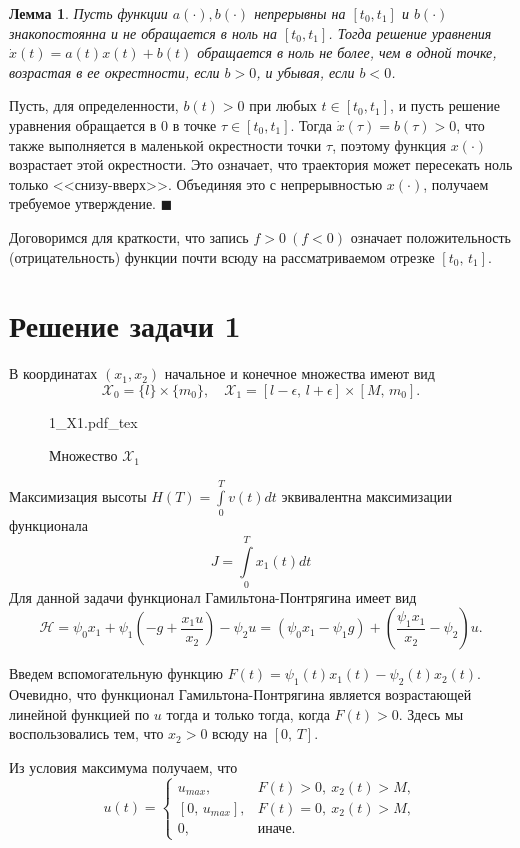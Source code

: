 \documentclass[16pt]{article}
\newcommand{\incfig}[2]{%
    \def\svgwidth{#2 mm}
    {#1.pdf_tex}
}
\newtheorem{Lem}{Лемма}
\newenvironment{Proof}{\par\noindent{\bf Доказательство.}}{\hfill$\scriptstyle\blacksquare$}
\newcommand\A{(\cdot)}
\newcommand\Int[2]{\int\limits_{#1}^{#2}}
\newcommand\X{\mathcal{X}}
\newcommand\Pict[3]{
\begin{figure}[h!]
    \centering
    \incfig{#1}{#3}
    \caption{#2}
    \label{fig:#1}
\end{figure}
}
\begin{document}
\begin{Lem}
Пусть функции $a\A, b\A$ непрерывны на $[t_0, t_1]$ и $b\A$ знакопостоянна и не обращается в ноль на $[t_0, t_1]$.
Тогда решение уравнения $\dot{x}(t) = a(t)x(t) + b(t)$ обращается в ноль не более, чем в одной точке, возрастая в ее  окрестности, если $b > 0$, и убывая, если $b < 0$.
\end{Lem}
\begin{Proof}
Пусть, для определенности, $b(t) > 0$ при любых $t \in [t_0, t_1]$, и пусть решение уравнения обращается в 0
в точке $\tau \in [t_0, t_1]$. Тогда $\dot{x}(\tau) = b(\tau) > 0$, что также выполняется в маленькой окрестности точки $\tau$, поэтому функция $x\A$ возрастает этой окрестности.
Это означает, что траектория может пересекать ноль только <<снизу-вверх>>. Объединяя это с непрерывностью $x\A$,
получаем требуемое утверждение.
\end{Proof}

Договоримся для краткости, что запись $f > 0 \ (f < 0)$ означает положительность (отрицательность)
 функции почти всюду на рассматриваемом отрезке 
$[t_0,\,t_1]$.
\section{Решение задачи 1}
В координатах $(x_1, x_2)$ начальное и конечное множества имеют вид
$$\X_0 = \{l\} \times \{m_0\}, \quad \X_1 = [l-\epsilon, \, l+\epsilon] \times [M, \, m_0].$$
\Pict{1_X1}{Множество $\X_1$}{90}

Максимизация высоты $H(T) = \Int{0}{T}v(t)dt$ эквивалентна максимизации функционала $$J = \Int{0}{T}x_1(t)dt$$
Для данной задачи функционал Гамильтона-Понтрягина имеет вид 
$$\mathcal{H} = \psi_0x_1 + \psi_1(-g + \frac{x_1u}{x_2}) - \psi_2u = (\psi_0x_1 - \psi_1g) +
 (\frac{\psi_1x_1}{x_2} - \psi_2)u.$$

Введем вспомогательную функцию $F(t) = \psi_1(t)x_1(t) - \psi_2(t)x_2(t)$. Очевидно, что функционал 
Гамильтона-Понтрягина является возрастающей линейной функцией по $u$ тогда и только тогда, когда $F(t) > 0$.
Здесь мы воспользовались тем, что $x_2 > 0$ всюду на $[0,\,T]$.
 
 
Из условия максимума получаем, что 
 \begin{equation} \label{oc_1}
 u(t) = 
 \begin{cases}
 u_{max}, & F(t) > 0,\  x_2(t) > M, \\
 [0,\, u_{max}], & F(t) = 0, \ x_2(t) > M, \\
 0, &\text{иначе.}
 \end{cases}
 \end{equation}
\end{document}
